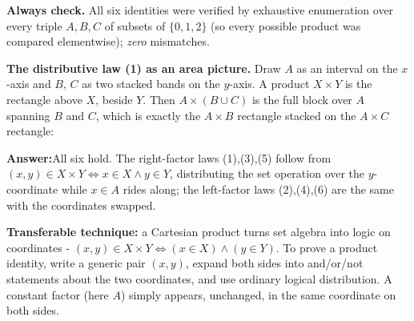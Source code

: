\documentclass[11pt,a4paper]{article}
\newcommand{\answer}[1]{\begin{answerbox}\centering\textbf{Answer:}\quad #1\end{answerbox}}
\begin{document}
\textbf{Always check.} All six identities were verified by exhaustive enumeration over every triple
$A,B,C$ of subsets of $\{0,1,2\}$ (so every possible product was compared elementwise);
\emph{zero} mismatches. \checkmark

\textbf{The distributive law (1) as an area picture.} Draw $A$ as an interval on the $x$-axis and
$B$, $C$ as two stacked bands on the $y$-axis. A product $X\times Y$ is the rectangle \textquotedbl{}above
$X$, beside $Y$\textquotedbl{}. Then $A\times(B\cup C)$ is the full block over $A$ spanning $B$ and
$C$, which is exactly the $A\times B$ rectangle stacked on the $A\times C$ rectangle:

\begin{center}
\end{center}

\answer{All six hold. The right-factor laws (1),(3),(5) follow from
$(x,y)\in X\times Y\iff x\in X\wedge y\in Y$, distributing the set operation over the
$y$-coordinate while $x\in A$ rides along; the left-factor laws (2),(4),(6) are the same with the
coordinates swapped.}

\begin{methodbox}
\textbf{Transferable technique:} a Cartesian product turns set algebra into logic on coordinates -
$(x,y)\in X\times Y\iff (x\in X)\wedge(y\in Y)$. To prove a product identity, write a generic pair
$(x,y)$, expand both sides into and/or/not statements about the two coordinates, and use ordinary
logical distribution. A constant factor (here $A$) simply appears, unchanged, in the same
coordinate on both sides.
\end{methodbox}
\end{document}
